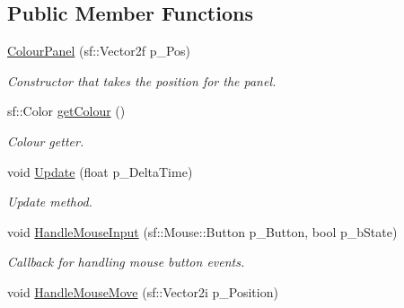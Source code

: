 \subsection*{Public Member Functions}
\begin{DoxyCompactItemize}
\item 
\mbox{\label{class_colour_panel_a5dc33d83d0aafa0c936c3989e6f11e39}} 
\hyperlink{class_colour_panel_a5dc33d83d0aafa0c936c3989e6f11e39}{Colour\+Panel} (sf\+::\+Vector2f p\+\_\+\+Pos)
\begin{DoxyCompactList}\small\item\em Constructor that takes the position for the panel. \end{DoxyCompactList}\item 
\mbox{\label{class_colour_panel_ad7a1677b7e21b6d1c3667358040f4719}} 
sf\+::\+Color \hyperlink{class_colour_panel_ad7a1677b7e21b6d1c3667358040f4719}{get\+Colour} ()
\begin{DoxyCompactList}\small\item\em Colour getter. \end{DoxyCompactList}\item 
\mbox{\label{class_colour_panel_ac9299d66643be6579c3541724c88d2de}} 
void \hyperlink{class_colour_panel_ac9299d66643be6579c3541724c88d2de}{Update} (float p\+\_\+\+Delta\+Time)
\begin{DoxyCompactList}\small\item\em Update method. \end{DoxyCompactList}\item 
\mbox{\label{class_colour_panel_a6f76355771589d3c8240d69777f76530}} 
void \hyperlink{class_colour_panel_a6f76355771589d3c8240d69777f76530}{Handle\+Mouse\+Input} (sf\+::\+Mouse\+::\+Button p\+\_\+\+Button, bool p\+\_\+b\+State)
\begin{DoxyCompactList}\small\item\em Callback for handling mouse button events. \end{DoxyCompactList}\item 
\mbox{\label{class_colour_panel_af8a216658cd97964e268626ef469dc15}} 
void \hyperlink{class_colour_panel_af8a216658cd97964e268626ef469dc15}{Handle\+Mouse\+Move} (sf\+::\+Vector2i p\+\_\+\+Position)

\end{DoxyCompactItemize}
